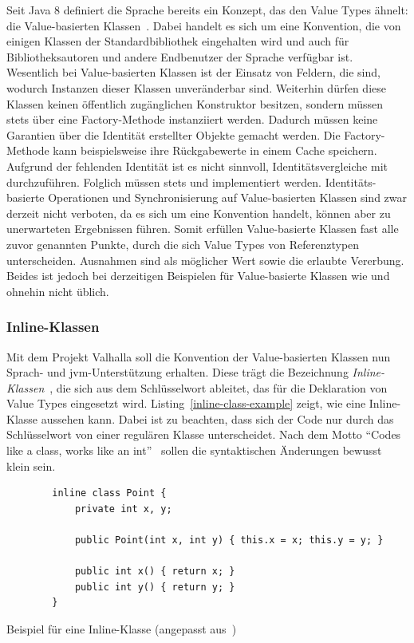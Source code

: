 Seit Java 8 definiert die Sprache bereits ein Konzept, das den Value Types ähnelt: die Value-basierten Klassen~\cite{value-based-classes}.
Dabei handelt es sich um eine Konvention, die von einigen Klassen der Standardbibliothek eingehalten wird und auch für Bibliotheksautoren und andere Endbenutzer der Sprache verfügbar ist.
Wesentlich bei Value-basierten Klassen ist der Einsatz von Feldern, die  sind, wodurch Instanzen dieser Klassen unveränderbar sind.
Weiterhin dürfen diese Klassen keinen öffentlich zugänglichen Konstruktor besitzen, sondern müssen stets über eine Factory-Methode instanziiert werden.
Dadurch müssen keine Garantien über die Identität erstellter Objekte gemacht werden.
Die Factory-Methode kann beispielsweise ihre Rückgabewerte in einem Cache speichern.
Aufgrund der fehlenden Identität ist es nicht sinnvoll, Identitätsvergleiche mit \code{==} durchzuführen.
Folglich müssen stets  und  implementiert werden.
Identitäts-basierte Operationen und Synchronisierung auf Value-basierten Klassen sind zwar derzeit nicht verboten, da es sich um eine Konvention handelt, können aber zu unerwarteten Ergebnissen führen.
Somit erfüllen Value-basierte Klassen fast alle zuvor genannten Punkte, durch die sich Value Types von Referenztypen unterscheiden.
Ausnahmen sind  als möglicher Wert sowie die erlaubte Vererbung.
Beides ist jedoch bei derzeitigen Beispielen für Value-basierte Klassen wie  und  ohnehin nicht üblich.

\subsubsection{Inline-Klassen}

Mit dem Projekt Valhalla soll die Konvention der Value-basierten Klassen nun Sprach- und \ac{jvm}-Unterstützung erhalten.
Diese trägt die Bezeichnung \emph{Inline-Klassen}~\cite{object-model}, die sich aus dem Schlüsselwort  ableitet, das für die Deklaration von Value Types eingesetzt wird.
Listing~\ref{inline-class-example} zeigt, wie eine Inline-Klasse aussehen kann.
Dabei ist zu beachten, dass sich der Code nur durch das Schlüsselwort  von einer regulären Klasse unterscheidet.
Nach dem Motto ``Codes like a class, works like an int''~\cite{object-model} sollen die syntaktischen Änderungen bewusst klein sein.

\begin{listing}
    \begin{verbatim}
        inline class Point {
            private int x, y;

            public Point(int x, int y) { this.x = x; this.y = y; }

            public int x() { return x; }
            public int y() { return y; }
        }
    \end{verbatim}
    \vspace{-3ex}
    \caption{Beispiel für eine Inline-Klasse (angepasst aus~\cite{object-model})}
    \label{inline-class-example}
\end{listing}

